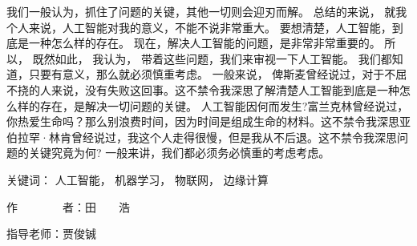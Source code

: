 
\begin{cabstract}
	我们一般认为，抓住了问题的关键，其他一切则会迎刃而解。 总结的来说， 就我个人来说，人工智能对我的意义，不能不说非常重大。 要想清楚，人工智能，到底是一种怎么样的存在。 现在，解决人工智能的问题，是非常非常重要的。 所以， 既然如此， 我认为， 带着这些问题，我们来审视一下人工智能。 我们都知道，只要有意义，那么就必须慎重考虑。 一般来说， 俾斯麦曾经说过，对于不屈不挠的人来说，没有失败这回事。这不禁令我深思了解清楚人工智能到底是一种怎么样的存在，是解决一切问题的关键。 人工智能因何而发生?富兰克林曾经说过，你热爱生命吗？那么别浪费时间，因为时间是组成生命的材料。这不禁令我深思亚伯拉罕·林肯曾经说过，我这个人走得很慢，但是我从不后退。这不禁令我深思问题的关键究竟为何? 一般来讲，我们都必须务必慎重的考虑考虑。
	
	\vskip 21bp
	{\heiti{} 关键词：}
	人工智能，
	机器学习，
	物联网，
	边缘计算
	
	\begin{flushright}
		作~~~~~~~~者：田~~~~浩
		
		指导老师：贾俊铖
		
	\end{flushright}
\end{cabstract}


